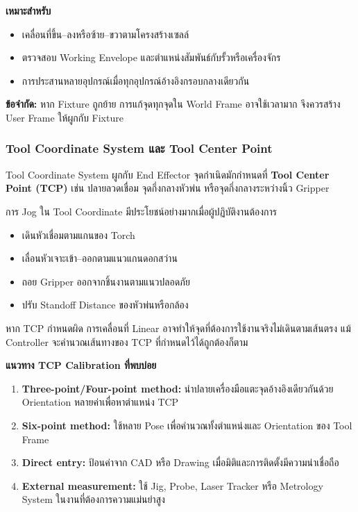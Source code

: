 \textbf{เหมาะสำหรับ}

\begin{itemize}
    \item เคลื่อนที่ขึ้น–ลงหรือซ้าย–ขวาตามโครงสร้างเซลล์
    \item ตรวจสอบ Working Envelope และตำแหน่งสัมพันธ์กับรั้วหรือเครื่องจักร
    \item การประสานหลายอุปกรณ์เมื่อทุกอุปกรณ์อ้างอิงกรอบกลางเดียวกัน
\end{itemize}

\textbf{ข้อจำกัด:} หาก Fixture ถูกย้าย การแก้จุดทุกจุดใน World Frame อาจใช้เวลามาก จึงควรสร้าง User Frame ให้ผูกกับ Fixture

\subsubsection{Tool Coordinate System และ Tool Center Point}

Tool Coordinate System ผูกกับ End Effector จุดกำเนิดมักกำหนดที่ \textbf{Tool Center Point (TCP)} เช่น ปลายลวดเชื่อม จุดกึ่งกลางหัวพ่น หรือจุดกึ่งกลางระหว่างนิ้ว Gripper

การ Jog ใน Tool Coordinate มีประโยชน์อย่างมากเมื่อผู้ปฏิบัติงานต้องการ

\begin{itemize}
    \item เดินหัวเชื่อมตามแกนของ Torch
    \item เลื่อนหัวเจาะเข้า–ออกตามแนวแกนดอกสว่าน
    \item ถอย Gripper ออกจากชิ้นงานตามแนวปลอดภัย
    \item ปรับ Standoff Distance ของหัวพ่นหรือกล้อง
\end{itemize}

หาก TCP กำหนดผิด การเคลื่อนที่ Linear อาจทำให้จุดที่ต้องการใช้งานจริงไม่เดินตามเส้นตรง แม้ Controller จะคำนวณเส้นทางของ TCP ที่กำหนดไว้ได้ถูกต้องก็ตาม

\textbf{แนวทาง TCP Calibration ที่พบบ่อย}

\begin{enumerate}
    \item \textbf{Three-point/Four-point method:} นำปลายเครื่องมือแตะจุดอ้างอิงเดียวกันด้วย Orientation หลายค่าเพื่อหาตำแหน่ง TCP
    \item \textbf{Six-point method:} ใช้หลาย Pose เพื่อคำนวณทั้งตำแหน่งและ Orientation ของ Tool Frame
    \item \textbf{Direct entry:} ป้อนค่าจาก CAD หรือ Drawing เมื่อมิติและการติดตั้งมีความน่าเชื่อถือ
    \item \textbf{External measurement:} ใช้ Jig, Probe, Laser Tracker หรือ Metrology System ในงานที่ต้องการความแม่นยำสูง
\end{enumerate}

